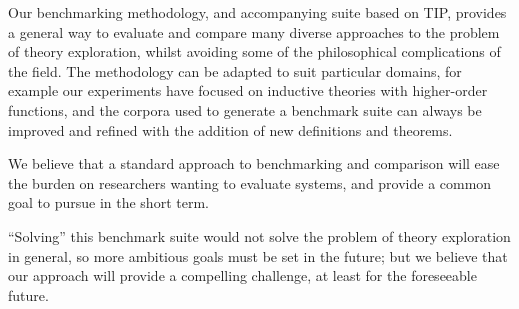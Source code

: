 
Our benchmarking methodology, and accompanying suite based on TIP, provides a
general way to evaluate and compare many diverse approaches to the problem of
theory exploration, whilst avoiding some of the philosophical complications of
the field. The methodology can be adapted to suit particular domains, for
example our experiments have focused on inductive theories with higher-order
functions, and the corpora used to generate a benchmark suite can always be
improved and refined with the addition of new definitions and theorems.

We believe that a standard approach to benchmarking and comparison will ease the
burden on researchers wanting to evaluate systems, and provide a common goal to
pursue in the short term.

``Solving'' this benchmark suite would not solve the problem of theory
exploration in general, so more ambitious goals must be set in the future; but
we believe that our approach will provide a compelling challenge, at least for
the foreseeable future.

%





